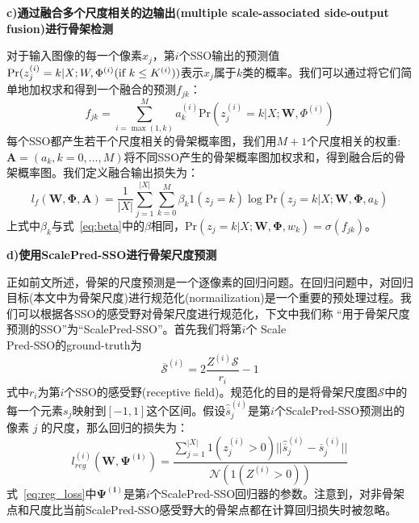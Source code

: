 \documentclass[UTF8]{ctexart}
\numberwithin{equation}{section} %
\numberwithin{table}{section} %
\begin{document}

\vspace{1em}
\noindent \textbf{c)通过融合多个尺度相关的边输出(multiple scale-associated side-output fusion)进行骨架检测}

对于输入图像的每一个像素$x_j$，第$i$个SSO输出的预测值$\text{Pr}(z^{(i)}_j=k|X;\\W,\Phi^{(i)}(\text{if} \ k  \leq K^{(i)}))$表示$x_j$属于$k$类的概率。我们可以通过将它们简单地加权求和得到一个融合的预测$f_{jk}$：
\begin{equation}
f_{jk} = \sum_{i=\max(1,k)}^M a^{(i)}_k \text{Pr}(z^{(i)}_j=k|X;\mathbf{W},\Phi^{(i)})
\label{eq:fuse_loss}
\end{equation}
每个SSO都产生若干个尺度相关的骨架概率图，我们用$M+1$个尺度相关的权重:$\mathbf{A}=(a_k,k=0,...,M)$将不同SSO产生的骨架概率图加权求和，得到融合后的骨架概率图。我们定义融合输出损失为：
\begin{equation}
l_{f}(\mathbf{W},\mathbf{\Phi,\mathbf{A}}) = \frac{1}{|X|}\sum_{j=1}^{|X|}\sum_{k=0}^M\beta_k1(z_j=k)\log \text{Pr}(z_j=k|X;\mathbf{W},\mathbf{\Phi},a_k)
\end{equation}
上式中$\beta_k$与式~\ref{eq:beta}中的$\beta$相同，$\text{Pr}(z_j=k|X;\mathbf{W},\mathbf{\Phi},w_k)=\sigma(f_{jk})$。

\vspace{1em}
\noindent \textbf{d)使用ScalePred-SSO进行骨架尺度预测}

正如前文所述，骨架的尺度预测是一个逐像素的回归问题。在回归问题中，对回归目标(本文中为骨架尺度)进行规范化(normailization)是一个重要的预处理过程。我们可以根据各SSO的感受野对骨架尺度进行规范化，下文中我们称
“用于骨架尺度预测的SSO”为“ScalePred-SSO”。首先我们将第$i$个 Scale\\Pred-SSO的ground-truth为
\begin{equation}
\overline{\mathcal{S}}^{(i)} = 2\frac{Z^{(i)}\mathcal{S}}{r_i}-1
\label{eq:scale_norm}
\end{equation} 
式中$r_i$为第$i$个SSO的感受野(receptive field)。规范化的目的是将骨架尺度图$\mathcal{S}$中的每一个元素$s_j$映射到$[-1,1]$这个区间。假设$\hat{\overline{s}}^{(i)}_j$是第$i$个ScalePred-SSO预测出的像素 $j$ 的尺度，那么回归的损失为：
\begin{equation}
l_{reg}^{(i)}(\mathbf{W},\mathbf{\Psi^{(i)}})=\frac{\sum_{j=1}^{|X|}1(z_j^{(i)}>0)||\hat{\overline{s}}_j^{(i)}-\overline{s}_j^{(i)}||}{\mathcal{N}(1(Z^{(i)}>0))}
\label{eq:reg_loss}
\end{equation}
式~\ref{eq:reg_loss}中$\mathbf{\Psi^{(i)}}$是第$i$个ScalePred-SSO回归器的参数。注意到，对非骨架点和尺度比当前ScalePred-SSO感受野大的骨架点都在计算回归损失时被忽略。
\end{document}
